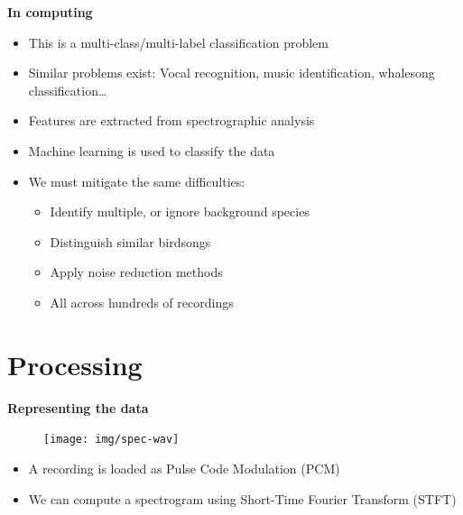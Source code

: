 \documentclass[t, xcolor={dvipsnames}]{beamer}
\begin{document}
\begin{frame}[fragile]
  \vspace{0.5cm}
  {\bfseries\Large In computing}\\
  \vspace{0.5cm}
  \begin{addmargin}{0.5cm}
    \begin{itemize}
      \item This is a multi-class/multi-label classification problem
      \item Similar problems exist: Vocal recognition, music identification, whalesong classification\ldots
      \item Features are extracted from spectrographic analysis
      \item Machine learning is used to classify the data
      \item We must mitigate the same difficulties:
      \begin{itemize}
        \item Identify multiple, or ignore background species
        \item Distinguish similar birdsongs
        \item Apply noise reduction methods
        \item All across hundreds of recordings
      \end{itemize}
    \end{itemize}
  \end{addmargin}
\end{frame}


\section{Processing}
\begin{frame}[fragile]
  \vspace{0.5cm}
  {\bfseries\Large Representing the data}
  \vspace{-0.20cm}
  \begin{figure}
    \texttt{[image: img/spec-wav]}
  \end{figure}

  \begin{itemize}
    \item A recording is loaded as Pulse Code Modulation (PCM)
   \item We can compute a spectrogram using Short-Time Fourier Transform (STFT)
  \end{itemize}
\end{frame}
\end{document}
